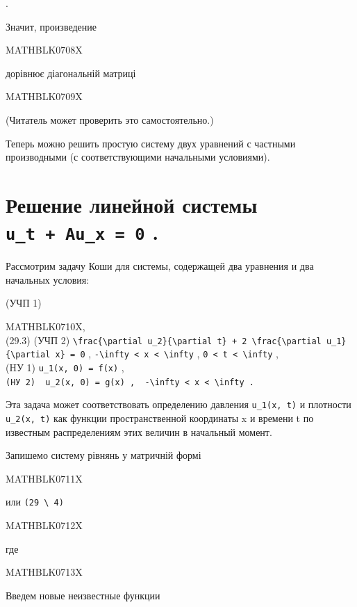 \documentclass[
  ukrainian,
]{article}
\begin{document}
.

Значит, произведение

MATHBLK0708X

дорівнює діагональній матриці

MATHBLK0709X

(Читатель может проверить это самостоятельно.)

Теперь можно решить простую систему двух уравнений с частными
производными (с соответствующими начальными условиями).

\section{\texorpdfstring{Решение линейной системы
\texttt{u\_t\ +\ Au\_x\ =\ 0}
.}{Решение линейной системы u\_t + Au\_x = 0 .}}\label{ux440ux435ux448ux435ux43dux438ux435-ux43bux438ux43dux435ux439ux43dux43eux439-ux441ux438ux441ux442ux435ux43cux44b-u_t-au_x-0-.}

Рассмотрим задачу Коши для системы, содержащей два уравнения и два
начальных условия:

(УЧП 1)

MATHBLK0710X,\\
(29.3) (УЧП 2)
\texttt{\textbackslash{}frac\{\textbackslash{}partial\ u\_2\}\{\textbackslash{}partial\ t\}\ +\ 2\ \textbackslash{}frac\{\textbackslash{}partial\ u\_1\}\{\textbackslash{}partial\ x\}\ =\ 0}
,
\texttt{-\textbackslash{}infty\ \textless{}\ x\ \textless{}\ \textbackslash{}infty}
, \texttt{0\ \textless{}\ t\ \textless{}\ \textbackslash{}infty} ,\\
(HУ 1) \texttt{u\_1(x,\ 0)\ =\ f(x)} ,\\
\texttt{(HУ\ 2)\ \ \textquotesingle{}u\_2(x,\ 0)\ =\ g(x)\textquotesingle{}\ ,\ \ \textquotesingle{}-\textbackslash{}infty\ \textless{}\ x\ \textless{}\ \textbackslash{}infty\textquotesingle{}\ .}

Эта задача может соответствовать определению давления
\texttt{u\_1(x,\ t)} и плотности \texttt{u\_2(x,\ t)} как функции
пространственной координаты x и времени t по известным распределениям
этих величин в начальный момент.

Запишемо систему рівнянь у матричній формі

MATHBLK0711X

или \texttt{(29\ \textbackslash{}\ 4)}

MATHBLK0712X

где

MATHBLK0713X

Введем новые неизвестные функции
\end{document}
